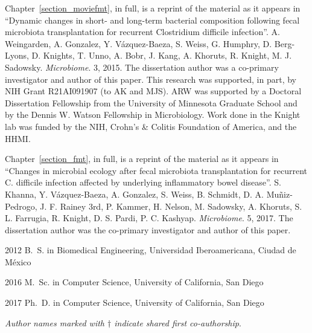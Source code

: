 \begin{frontmatter}
\begin{acknowledgements}
    Chapter~\ref{section_moviefmt}, in full, is a reprint of the material as it 
    appears in ``Dynamic changes in short- and long-term bacterial composition 
    following fecal microbiota transplantation for recurrent Clostridium 
    difficile infection''.  A. Weingarden, A. Gonzalez, Y.  V\'azquez-Baeza, S.  
    Weiss, G.  Humphry, D. Berg-Lyons, D. Knights, T.  Unno, A. Bobr, J.  Kang, 
    A. Khoruts, R. Knight, M. J. Sadowsky. \emph{Microbiome}. 3, 2015.  The 
    dissertation author was a co-primary investigator and author of this 
    paper. This research was supported, in part, by NIH Grant R21AI091907 (to 
    AK and MJS). ARW was supported by a Doctoral Dissertation Fellowship from 
    the University of Minnesota Graduate School and by the Dennis W.  Watson 
    Fellowship in Microbiology. Work done in the Knight lab was funded by the 
    NIH, Crohn's \& Colitis Foundation of America, and the HHMI.  

    Chapter~\ref{section_fmt}, in full, is a reprint of the material as it 
    appears in ``Changes in microbial ecology after fecal microbiota 
    transplantation for recurrent C. difficile infection affected by underlying 
    inflammatory bowel disease''. S. Khanna, Y.  V\'azquez-Baeza, A.  Gonzalez, 
    S. Weiss, B.  Schmidt, D. A.  Muñiz-Pedrogo, J. F. Rainey 3rd, P. Kammer, 
    H. Nelson, M.  Sadowsky, A.  Khoruts, S. L. Farrugia, R. Knight, D. S.  
    Pardi, P. C.  Kashyap. \emph{Microbiome}. 5, 2017. The dissertation author 
    was the co-primary investigator and author of this paper.

\end{acknowledgements}


%
%
\begin{vitapage}
\begin{vita}
  \item[2012] B.~S. in Biomedical Engineering, Universidad Iberoamericana, Ciudad de M\'exico
  \item[2016] M.~Sc. in Computer Science, University of California, San Diego
  \item[2017] Ph.~D. in Computer Science, University of California, San Diego 
\end{vita}


\begin{publications}

    \item \textsl{Author names marked with $\dagger$ indicate shared first co-authorship}.


\end{publications}
\end{vitapage}
\end{frontmatter}
